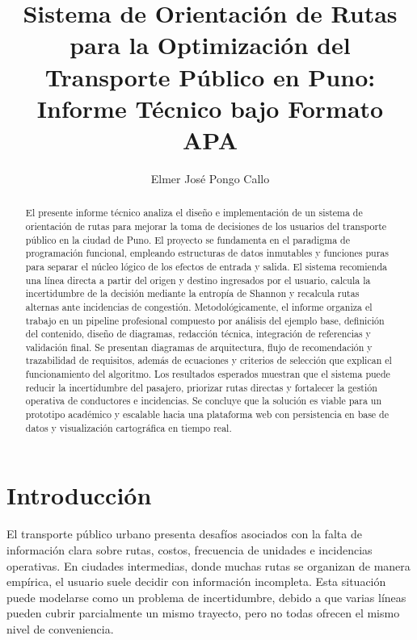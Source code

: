 \documentclass[stu,12pt,floatsintext]{apa7}
\title{Sistema de Orientación de Rutas para la Optimización del Transporte Público en Puno: Informe Técnico bajo Formato APA}
\author{Elmer José Pongo Callo}
\affiliation{Universidad Nacional del Altiplano}
\begin{document}
\maketitle

\begin{abstract}
El presente informe técnico analiza el diseño e implementación de un sistema de orientación de rutas para mejorar la toma de decisiones de los usuarios del transporte público en la ciudad de Puno. El proyecto se fundamenta en el paradigma de programación funcional, empleando estructuras de datos inmutables y funciones puras para separar el núcleo lógico de los efectos de entrada y salida. El sistema recomienda una línea directa a partir del origen y destino ingresados por el usuario, calcula la incertidumbre de la decisión mediante la entropía de Shannon y recalcula rutas alternas ante incidencias de congestión. Metodológicamente, el informe organiza el trabajo en un pipeline profesional compuesto por análisis del ejemplo base, definición del contenido, diseño de diagramas, redacción técnica, integración de referencias y validación final. Se presentan diagramas de arquitectura, flujo de recomendación y trazabilidad de requisitos, además de ecuaciones y criterios de selección que explican el funcionamiento del algoritmo. Los resultados esperados muestran que el sistema puede reducir la incertidumbre del pasajero, priorizar rutas directas y fortalecer la gestión operativa de conductores e incidencias. Se concluye que la solución es viable para un prototipo académico y escalable hacia una plataforma web con persistencia en base de datos y visualización cartográfica en tiempo real.
\end{abstract}


\section{Introducción}
El transporte público urbano presenta desafíos asociados con la falta de información clara sobre rutas, costos, frecuencia de unidades e incidencias operativas. En ciudades intermedias, donde muchas rutas se organizan de manera empírica, el usuario suele decidir con información incompleta. Esta situación puede modelarse como un problema de incertidumbre, debido a que varias líneas pueden cubrir parcialmente un mismo trayecto, pero no todas ofrecen el mismo nivel de conveniencia.
\end{document}
